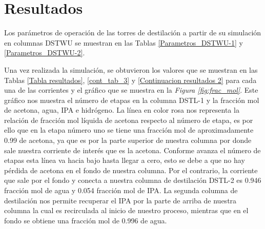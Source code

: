 \section*{Resultados}
    Los parámetros de operación de las torres de destilación a partir de su simulación 
    en columnas DSTWU se muestran en las Tablas \ref{Parametros_DSTWU-1} y 
    \ref{Parametros_DSTWU-2}.




    Una vez realizada la simulación, se obtuvieron los valores que se muestran en las Tablas
    \ref{Tabla resultados}, \ref{cont_tab_3} y \ref{Continuacion resultados 2} para cada una
    de las corrientes y el gráfico que se muestra en la \textit{Figura \ref{fig:frac_mol}}. 
    Este gráfico nos muestra el número de etapas en la columna DSTL-1 y la fracción mol de acetona,
    agua, IPA e hidrógeno. La línea en color rosa nos representa la relación de fracción mol líquida 
    de acetona respecto al número de etapa, es por ello que en la etapa número uno se tiene una 
    fracción mol de aproximadamente 0.99 de acetona, ya que es por la parte superior de nuestra 
    columna por donde sale nuestra corriente de interés que es la acetona. Conforme avanza el
    número de etapas esta línea va hacia bajo hasta llegar a cero, esto se debe a que no hay
    pérdida de acetona en el fondo de nuestra columna. Por el contrario, la corriente que sale
    por el fondo y conecta a nuestra columna de destilación DSTL-2 es 0.946 fracción mol de 
    agua y 0.054 fracción mol de IPA. La segunda columna de destilación nos permite recuperar el
    IPA por la parte de arriba de nuestra columna la cual es recirculada al inicio de nuestro 
    proceso, mientras que en el fondo se obtiene una fracción mol de 0.996 de agua.







